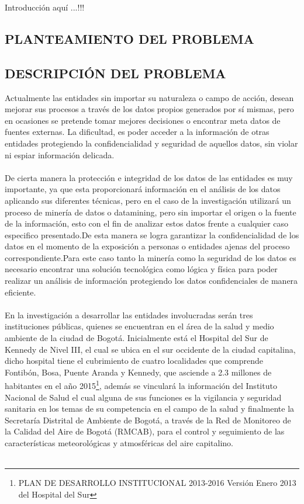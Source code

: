 \documentclass[a4paper,openright,12pt]{book}
\theoremstyle{definition}
\theoremstyle{remark}
\begin{document}
Introducción aquí ...!!!

\clearpage

\begin{center}
 \chapter{PLANTEAMIENTO DEL PROBLEMA}\label{cap.planteamiento}
 \end{center}
 

\section{DESCRIPCIÓN DEL PROBLEMA}

Actualmente las entidades sin importar su naturaleza o campo de acción, desean mejorar sus procesos a través de los datos propios generados por sí mismas, pero en ocasiones  se pretende tomar mejores decisiones o encontrar meta datos de fuentes externas. La dificultad, es poder acceder a la información de otras entidades protegiendo la confidencialidad y seguridad de aquellos datos, sin violar ni espiar información delicada.\\\\
De cierta manera la protección e integridad de los datos de las entidades es muy importante, ya que esta proporcionará información en el análisis de los datos aplicando sus diferentes técnicas, pero en el caso de la investigación utilizará un proceso de minería de datos o datamining, pero sin importar el origen o la fuente de la información, esto con el fin de analizar estos datos frente a cualquier caso especifico presentado.De esta manera se logra garantizar la confidencialidad de los datos en el momento de la exposición a personas o entidades ajenas del proceso correspondiente.Para este caso tanto la minería como la seguridad de los datos es necesario encontrar una solución tecnológica como lógica y física para poder realizar un análisis de información protegiendo los datos confidenciales de manera eficiente.\\\\
En la investigación a desarrollar las entidades involucradas serán tres instituciones públicas, quienes se encuentran en el área de la salud y medio ambiente de la ciudad de Bogotá. Inicialmente está el Hospital del Sur de Kennedy de Nivel III, el cual se ubica en el sur occidente de la ciudad capitalina, dicho hospital tiene el cubrimiento de cuatro localidades que comprende Fontibón, Bosa, Puente Aranda y Kennedy, que asciende a 2.3 millones de habitantes en el año 2015\footnote{PLAN DE DESARROLLO INSTITUCIONAL 2013-2016 Versión Enero 2013 del Hospital del Sur}, además se vinculará la información del Instituto Nacional de Salud el cual alguna de sus funciones es la vigilancia y seguridad sanitaria en los temas de su competencia en el campo de la salud y finalmente la Secretaría Distrital de Ambiente de Bogotá, a través de la Red de Monitoreo de la Calidad del Aire de Bogotá (RMCAB), para el control y seguimiento de las características meteorológicas y atmosféricas del aire capitalino.\\\\
\end{document}
